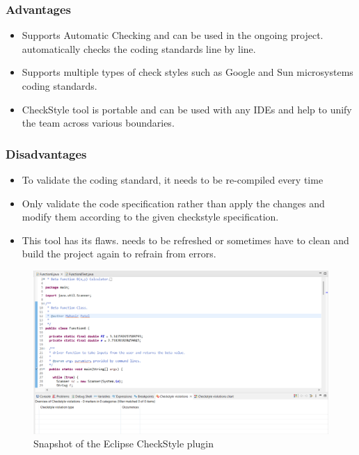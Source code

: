 \documentclass[12pt,a4paper]{report}
\begin{document}
\subsubsection{Advantages}
    \begin{itemize}[noitemsep]
        \item Supports Automatic Checking and can be used in the ongoing project. automatically checks the coding standards line by line.
        \item Supports multiple types of check styles such as Google and Sun microsystems coding standards.
        \item CheckStyle tool is portable and can be used with any IDEs and help to unify the team across various boundaries.
    \end{itemize}

\subsubsection{Disadvantages}
    \begin{itemize}[noitemsep]
        \item To validate the coding standard, it needs to be re-compiled every time
        \item Only validate the code specification rather than apply the changes and modify them according to the given checkstyle specification.
        \item This tool has its flaws. needs to be refreshed or sometimes have to clean and build the project again to refrain from errors.
    \end{itemize}
    
\begin{figure}[h]
    \centering
    \begin{center}
    \includegraphics[width=1.0\linewidth]{Images/Checkstyle_tool_snapshot.png}    
    \end{center}
    \caption{Snapshot of the Eclipse CheckStyle plugin }
    \label{fig:Eclipse CheckStyle Plugin}
\end{figure}
\end{document}
